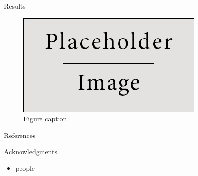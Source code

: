 \documentclass[final,hyperref={pdfpagelabels=false}]{beamer}
\begin{document}
\begin{frame}[t]
\begin{columns}[t]
\begin{column}{0.405\textwidth}
	\begin{block}{Results}
		\begin{figure}
			\includegraphics[width=0.8\linewidth]{figures/placeholder.jpg}
			\caption{Figure caption}
		\end{figure}
	\end{block}


	\begin{block}{References}
		\small{
		}
	\end{block}



	\begin{block}{Acknowledgments}
		\begin{itemize}
			\item people
		\end{itemize}
	\end{block}


\end{column} 



\begin{column}{0.02\textwidth}\end{column} %

\end{columns} 
\end{frame} 
\end{document}
